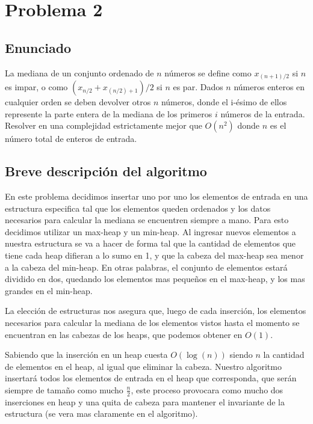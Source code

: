 \documentclass{article}
\theoremstyle{definition}
\theoremstyle{remark}
\begin{document}
\pagebreak

\section{Problema 2}

\subsection{Enunciado}

La mediana de un conjunto ordenado de $n$ números se define como $x_{(n+1)/2}$ si $n$ es impar, o como $(x_{n/2} + x_{(n/2)+1})/2$ si $n$ es par. Dados $n$ números enteros en cualquier orden se deben devolver otros $n$ números, donde el i-ésimo de ellos represente la parte entera de la mediana de los primeros $i$ números de la entrada.
Resolver en una complejidad estrictamente mejor que $O(n^2)$ donde $n$ es el número total de enteros de entrada.

\subsection{Breve descripción del algoritmo}

En este problema decidimos insertar uno por uno los elementos de entrada en una estructura especifica tal que los elementos queden ordenados y los datos necesarios para calcular la mediana se encuentren siempre a mano. Para esto decidimos utilizar un max-heap y un min-heap. Al ingresar nuevos elementos a nuestra estructura se va a hacer de forma tal que la cantidad de elementos que tiene cada heap difieran a lo sumo en 1, y que la cabeza del max-heap sea menor a la cabeza del min-heap. En otras palabras, el conjunto de elementos estará dividido en dos, quedando los elementos mas pequeños en el max-heap, y los mas grandes en el min-heap.

La elección de estructuras nos asegura que, luego de cada inserción, los elementos necesarios para calcular la mediana de los elementos vistos hasta el momento se encuentran en las cabezas de los heaps, que podemos obtener en $O(1)$.

Sabiendo que la inserción en un heap cuesta $O(\log(n))$ siendo $n$ la cantidad de elementos en el heap, al igual que eliminar la cabeza. Nuestro algoritmo insertará todos los elementos de entrada en el heap que corresponda, que serán siempre de tamaño como mucho $\frac{n}{2}$, este proceso provocara como mucho dos inserciones en heap y una quita de cabeza para mantener el invariante de la estructura (se vera mas claramente en el algoritmo).
\end{document}

